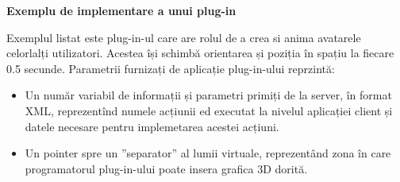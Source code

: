 \newpage
\par \textbf{Exemplu de implementare a unui plug-in}
\par Exemplul listat este plug-in-ul care are rolul de a crea si anima avatarele celorlalți utilizatori. Acestea își schimbă orientarea și poziția în spațiu la fiecare 0.5 secunde. Parametrii furnizați de aplicație plug-in-ului reprzintă:

\begin{itemize}
\item Un număr variabil de informații și parametri primiți de la server, în format XML, reprezentînd numele acțiunii ed executat la nivelul aplicației client și datele necesare pentru implemetarea acestei acțiuni.
\item Un pointer spre un ”separator” al lumii virtuale, reprezentând zona în care programatorul plug-in-ului poate insera grafica 3D dorită.
\end{itemize}

